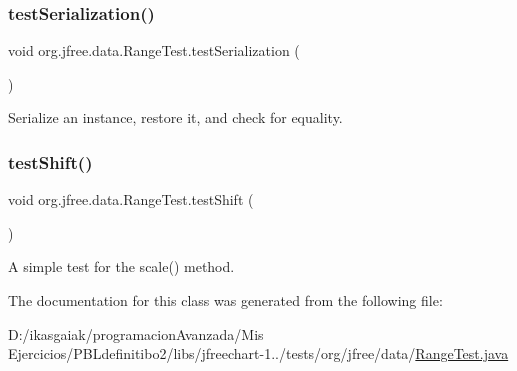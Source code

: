 \subsubsection{\texorpdfstring{test\+Serialization()}{testSerialization()}}
{\footnotesize\ttfamily void org.\+jfree.\+data.\+Range\+Test.\+test\+Serialization (\begin{DoxyParamCaption}{ }\end{DoxyParamCaption})}

Serialize an instance, restore it, and check for equality. \mbox{\label{classorg_1_1jfree_1_1data_1_1_range_test_a3b81cfbd94bf694c615089d83df019fd}} 
\subsubsection{\texorpdfstring{test\+Shift()}{testShift()}}
{\footnotesize\ttfamily void org.\+jfree.\+data.\+Range\+Test.\+test\+Shift (\begin{DoxyParamCaption}{ }\end{DoxyParamCaption})}

A simple test for the scale() method. 

The documentation for this class was generated from the following file\+:\begin{DoxyCompactItemize}
\item 
D\+:/ikasgaiak/programacion\+Avanzada/\+Mis Ejercicios/\+P\+B\+Ldefinitibo2/libs/jfreechart-\/1../tests/org/jfree/data/\mbox{\hyperlink{_range_test_8java}{Range\+Test.\+java}}\end{DoxyCompactItemize}
